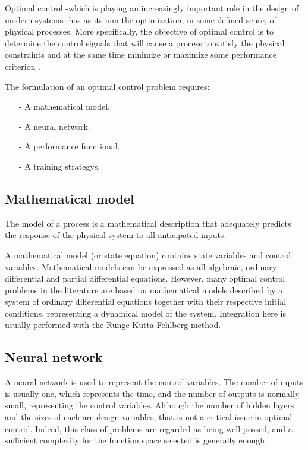 Optimal control -which is playing an increasingly important role in
the design of modern systems- has as its aim the optimization,
in some defined sense, of physical processes. 
More specifically, the
objective of optimal control is to determine the control signals
that will cause a process to satisfy the physical constraints and at
the same time minimize or maximize some performance criterion
\cite{Kirk1970}.

The formulation of an optimal control problem requires:

\begin{itemize}
\item[-] A mathematical model.
\item[-] A neural network.
\item[-] A performance functional.
\item[-] A training strategys.
\end{itemize}

\subsection*{Mathematical model}

The model of a process is a mathematical description that
adequately predicts the response of the physical system to all
anticipated inputs.

A mathematical model (or state equation) contains state variables and control variables. 
Mathematical models can be expressed as all algebraic, ordinary differential and partial differential equations. 
However, many optimal control problems in the literature are based on mathematical models described by a system of ordinary differential equations together with their respective initial conditions, representing a dynamical model of the system. 
Integration here is usually performed with the Runge-Kutta-Fehlberg method.

\subsection*{Neural network}

A neural network is used to represent the control variables. 
The number of inputs is usually one, which represents the time, and the number of outputs is normally small, representing the control variables. 
Although the number of hidden layers and the sizes of each are design variables, that is not a critical issue in optimal control. 
Indeed, this class of problems are regarded as being well-possed, 
and a sufficient complexity for the function space selected is generally enough. 

